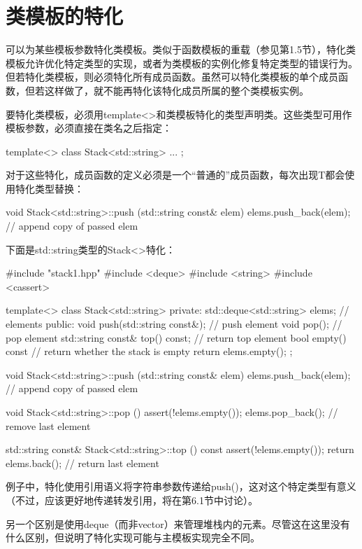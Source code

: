\section{类模板的特化}

可以为某些模板参数特化类模板。类似于函数模板的重载（参见第1.5节），特化类模板允许优化特定类型的实现，或者为类模板的实例化修复特定类型的错误行为。但若特化类模板，则必须特化所有成员函数。虽然可以特化类模板的单个成员函数，但若这样做了，就不能再特化该特化成员所属的整个类模板实例。

要特化类模板，必须用template<>和类模板特化的类型声明类。这些类型可用作模板参数，必须直接在类名之后指定：

\begin{cpp}
template<>
class Stack<std::string> {
	...
};
\end{cpp}

对于这些特化，成员函数的定义必须是一个“普通的”成员函数，每次出现T都会使用特化类型替换：

\begin{cpp}
void Stack<std::string>::push (std::string const& elem)
{
	elems.push_back(elem); // append copy of passed elem
}
\end{cpp}

下面是std::string类型的Stack<>特化：

\begin{cpp}
#include "stack1.hpp"
#include <deque>
#include <string>
#include <cassert>

template<>
class Stack<std::string> {
	private:
	std::deque<std::string> elems; // elements
	public:
	void push(std::string const&); // push element
	void pop(); // pop element
	std::string const& top() const; // return top element
	bool empty() const { // return whether the stack is empty
		return elems.empty();
	}
};

void Stack<std::string>::push (std::string const& elem)
{
	elems.push_back(elem); // append copy of passed elem
}

void Stack<std::string>::pop ()
{
	assert(!elems.empty());
	elems.pop_back(); // remove last element
}

std::string const& Stack<std::string>::top () const
{
	assert(!elems.empty());
	return elems.back(); // return last element
}
\end{cpp}

例子中，特化使用引用语义将字符串参数传递给push()，这对这个特定类型有意义（不过，应该更好地传递转发引用，将在第6.1节中讨论）。

另一个区别是使用deque（而非vector）来管理堆栈内的元素。尽管这在这里没有什么区别，但说明了特化实现可能与主模板实现完全不同。





















